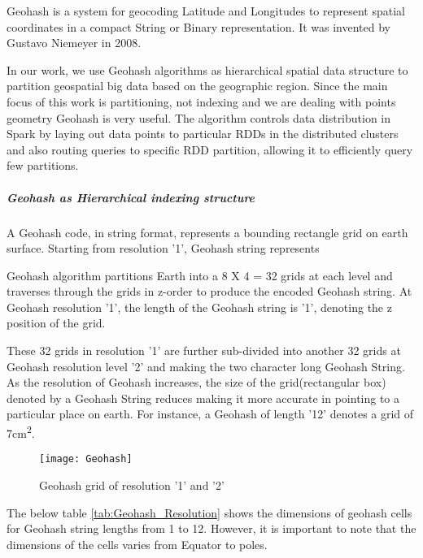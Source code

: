 \documentclass[article,type=msc,colorback,12pt,accentcolor=tud1d]{tudthesis}
\begin{document}
		   Geohash is a system for geocoding Latitude and Longitudes to represent spatial coordinates in a compact String or Binary representation. It was invented by Gustavo Niemeyer in 2008. 		   \cite{wiki:geohash} \cite{Lee:2014:ESQ:2666310.2666481, 6691586} \cite{Balkic2012}
		   
		   In our work, we use  Geohash algorithms as hierarchical spatial data structure to partition geospatial big data based on the geographic region. Since the main focus of this work is partitioning, not indexing and we are dealing with points geometry Geohash is very useful. The algorithm controls data distribution in Spark by laying out data points to particular RDDs in the distributed clusters and also routing queries to specific RDD partition, allowing it to efficiently query few partitions.
		   
		   \subparagraph{Geohash as Hierarchical indexing structure}
		   
		   A Geohash code, in string format, represents a bounding rectangle grid on earth surface. Starting from resolution '1', Geohash string represents 
		   
		   Geohash algorithm partitions Earth into a 8 X 4 = 32 grids at each level and traverses through the grids in z-order \cite{wiki:Zcurves_1, wiki:Zcurves} to produce the encoded Geohash string. At Geohash resolution '1', the length of the Geohash string is '1', denoting the z position of the grid.
		   
		   These 32 grids in resolution '1' are further sub-divided into another 32 grids at Geohash resolution level '2' and making the two character long Geohash String. As the resolution of Geohash increases, the size of the grid(rectangular box) denoted by a Geohash String reduces making it more accurate in pointing to a particular place on earth. For instance, a Geohash of length '12' denotes a grid of 7cm\textsuperscript{2}.
			
				\begin{figure}[h]
				\centering
				\texttt{[image: Geohash]}
				\caption{Geohash grid of resolution '1' and '2'}
				\label{fig:Geohash}
				\end{figure}
						   
		   \clearpage
		   The below table \ref{tab:Geohash_Resolution} shows the dimensions of geohash cells for Geohash string lengths from 1 to 12. However, it is important to note that the dimensions of the cells varies from Equator to poles. 
		   \cite{elastic_geohash}
		   
\end{document}
